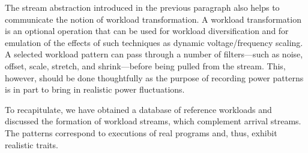 The stream abstraction introduced in the previous paragraph also helps to
communicate the notion of workload transformation. A workload transformation is
an optional operation that can be used for workload diversification and for
emulation of the effects of such techniques as dynamic voltage/frequency
scaling. A selected workload pattern can pass through a number of filters---such
as noise, offset, scale, stretch, and shrink---before being pulled from the
stream. This, however, should be done thoughtfully as the purpose of recording
power patterns is in part to bring in realistic power fluctuations.

To recapitulate, we have obtained a database of reference workloads and
discussed the formation of workload streams, which complement arrival streams.
The patterns correspond to executions of real programs and, thus, exhibit
realistic traits.
